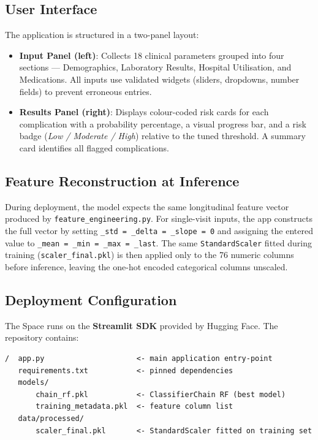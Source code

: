 \documentclass[12pt]{article}
\begin{document}
\subsection{User Interface}

The application is structured in a two-panel layout:

\begin{itemize}
    \item \textbf{Input Panel (left)}: Collects 18 clinical parameters grouped into
          four sections --- Demographics, Laboratory Results, Hospital Utilisation, and
          Medications. All inputs use validated widgets (sliders, dropdowns, number
          fields) to prevent erroneous entries.

    \item \textbf{Results Panel (right)}: Displays colour-coded risk cards for each
          complication with a probability percentage, a visual progress bar, and a
          risk badge (\textit{Low / Moderate / High}) relative to the tuned threshold.
          A summary card identifies all flagged complications.
\end{itemize}

\subsection{Feature Reconstruction at Inference}

During deployment, the model expects the same longitudinal feature vector produced
by \texttt{feature\_engineering.py}. For single-visit inputs, the app constructs
the full vector by setting \texttt{\_std = \_delta = \_slope = 0} and assigning
the entered value to \texttt{\_mean = \_min = \_max = \_last}. The same
\texttt{StandardScaler} fitted during training (\texttt{scaler\_final.pkl}) is
then applied only to the 76 numeric columns before inference, leaving the
one-hot encoded categorical columns unscaled.

\subsection{Deployment Configuration}

The Space runs on the \textbf{Streamlit SDK} provided by Hugging Face.
The repository contains:

\begin{verbatim}
/  app.py                     <- main application entry-point
   requirements.txt           <- pinned dependencies
   models/
       chain_rf.pkl           <- ClassifierChain RF (best model)
       training_metadata.pkl  <- feature column list
   data/processed/
       scaler_final.pkl       <- StandardScaler fitted on training set
\end{verbatim}
\end{document}
